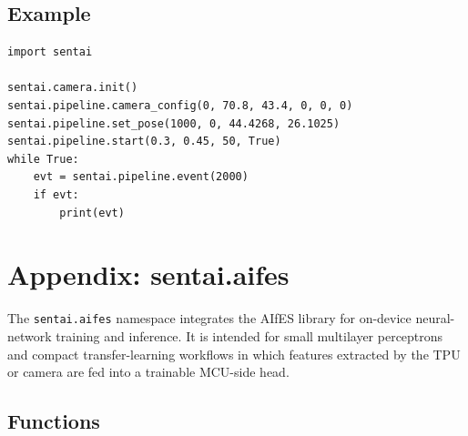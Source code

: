 \subsection{Example}\label{example-14}

\begin{verbatim}
import sentai

sentai.camera.init()
sentai.pipeline.camera_config(0, 70.8, 43.4, 0, 0, 0)
sentai.pipeline.set_pose(1000, 0, 44.4268, 26.1025)
sentai.pipeline.start(0.3, 0.45, 50, True)
while True:
    evt = sentai.pipeline.event(2000)
    if evt:
        print(evt)
\end{verbatim}

\section{Appendix: sentai.aifes}\label{appendix-sentai.aifes}

The \texttt{sentai.aifes} namespace integrates the AIfES library for
on-device neural-network training and inference. It is intended for
small multilayer perceptrons and compact transfer-learning workflows in
which features extracted by the TPU or camera are fed into a trainable
MCU-side head.

\subsection{Functions}\label{functions-15}

